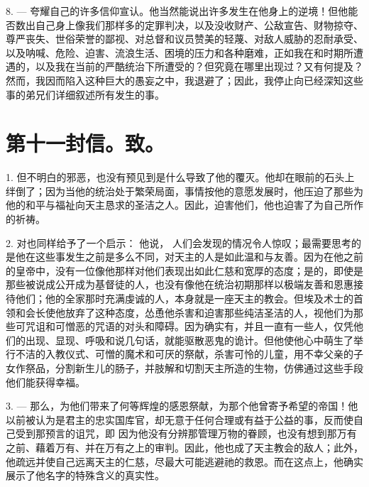 8. — 夸耀自己的许多信仰宣认。他当然能说出许多发生在他身上的逆境！但他能否数出自己身上像我们那样多的定罪判决，以及没收财产、公敌宣告、财物掠夺、尊严丧失、世俗荣誉的鄙视、对总督和议员赞美的轻蔑、对敌人威胁的忍耐承受、以及呐喊、危险、迫害、流浪生活、困境的压力和各种磨难，正如我在和时期所遭遇的，以及我在当前的严酷统治下所遭受的？但究竟在哪里出现过？又有何提及？然而，我因而陷入这种巨大的愚妄之中，我退避了；因此，我停止向已经深知这些事的弟兄们详细叙述所有发生的事。\par


\section{第十一封信。致。}

1. 但不明白的邪恶，也没有预见到是什么导致了他的覆灭。他却在眼前的石头上绊倒了；因为当他的统治处于繁荣局面，事情按他的意愿发展时，他压迫了那些为他的和平与福祉向天主恳求的圣洁之人。因此，迫害他们，他也迫害了为自己所作的祈祷。\par

2. 对也同样给予了一个启示： 他说， 人们会发现的情况令人惊叹；最需要思考的是他在这些事发生之前是多么不同，对天主的人是如此温和与友善。因为在他之前的皇帝中，没有一位像他那样对他们表现出如此仁慈和宽厚的态度；是的，即使是那些被说成公开成为基督徒的人，也没有像他在统治初期那样以极端友善和恩惠接待他们；他的全家那时充满虔诚的人，本身就是一座天主的教会。但埃及术士的首领和会长使他放弃了这种态度，怂恿他杀害和迫害那些纯洁圣洁的人，视他们为那些可咒诅和可憎恶的咒语的对头和障碍。因为确实有，并且一直有一些人，仅凭他们的出现、显现、呼吸和说几句话，就能驱散恶鬼的诡计。但他使他心中萌生了举行不洁的入教仪式、可憎的魔术和可厌的祭献，杀害可怜的儿童，用不幸父亲的子女作祭品，分割新生儿的肠子，并肢解和切割天主所造的生物，仿佛通过这些手段他们能获得幸福。\par

3. — 那么，为他们带来了何等辉煌的感恩祭献，为那个他曾寄予希望的帝国！他以前被认为是君主的忠实国库官，却无意于任何合理或有益于公益的事，反而使自己受到那预言的诅咒，即  因为他没有分辨那管理万物的眷顾，也没有想到那万有之前、藉着万有、并在万有之上的审判。因此，他也成了天主教会的敌人；此外，他疏远并使自己远离天主的仁慈，尽最大可能逃避祂的救恩。而在这点上，他确实展示了他名字的特殊含义的真实性。\par

